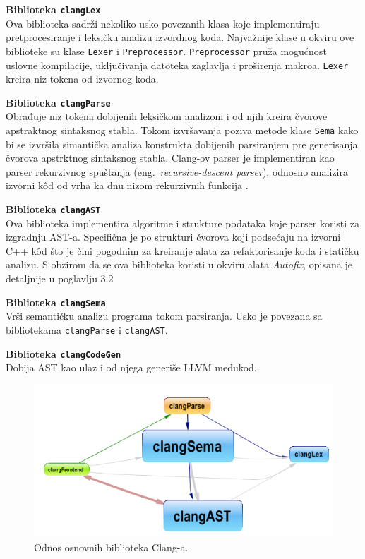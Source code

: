 \documentclass[12pt,oneside]{memoir}
\begin{document}
\begin{description}
  \item{\textbf{Biblioteka \texttt{clangLex}} \\
       Ova biblioteka sadr\v{z}i nekoliko usko povezanih klasa koje implementiraju pretprocesiranje i leksi\v{c}ku analizu izvordnog koda. Najva\v{z}nije klase u okviru ove biblioteke
       su klase \texttt{Lexer} i  \texttt{Preprocessor}.
       \texttt{Preprocessor} pru\v{z}a mogućnost uslovne kompilacije, uključivanja datoteka zaglavlja i proširenja makroa.
       \texttt{Lexer} kreira niz tokena od izvornog koda.}
  \item{\textbf{Biblioteka \texttt{clangParse}} \\
        Obrađuje niz tokena dobijenih leksi\v{c}kom analizom i od njih kreira \v{c}vorove apstraktnog sintaksnog stabla. Tokom izvr\v{s}avanja poziva metode klase
        \texttt{Sema} kako bi se izvr\v{s}ila simanti\v{c}ka analiza konstrukta dobijenih parsiranjem pre generisanja \v{c}vorova apstrktnog sintaksnog stabla.
        Clang-ov parser je implementiran kao parser rekurzivnog spuštanja (eng.~\textit{recursive-descent parser}), odnosno analizira izvorni k\^{o}d  od vrha ka dnu nizom rekurzivnih funkcija \cite{LLVMCoreLibraries}.}
  \item{\textbf{Biblioteka \texttt{clangAST}} \\
        Ova biblioteka implementira algoritme i strukture podataka koje parser koristi za izgradnju AST-a. Specifična je po strukturi čvorova koji podsećaju na izvorni C++ k\^{o}d  što je čini pogodnim za kreiranje alata za refaktorisanje koda i statičku analizu. S obzirom da se ova biblioteka koristi u okviru alata \textit{Autofix}, opisana je detaljnije u poglavlju 3.2}
  \item{\textbf{Biblioteka \texttt{clangSema}} \\
        Vrši semantičku analizu programa tokom parsiranja. Usko je povezana sa bibliotekama \texttt{clangParse} i \texttt{clangAST}.}
  \item{\textbf{Biblioteka \texttt{clangCodeGen}} \\
        Dobija AST kao ulaz i od njega generiše LLVM međukod.}

\end{description}

\begin{figure}[!ht]
  \centering
  \includegraphics[width=1\textwidth]{ClangBiblioteke.png}
  \caption{Odnos osnovnih biblioteka Clang-a.}
  \label{fig:grafikon}
\end{figure}
\end{document}
